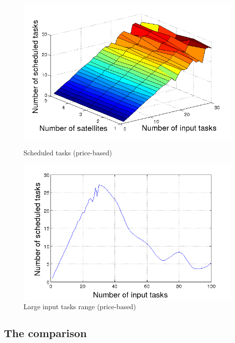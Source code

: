 \begin{figure}[ht]
  \begin{minipage}[b]{0.5\linewidth}
    \includegraphics[width=\linewidth]{Figures/aMB_sw.png}
    \caption{Scheduled tasks (price-based)}\label{fig_aMB_sw}
  \end{minipage}
    \begin{minipage}[b]{0.5\linewidth}
    \includegraphics[width=\linewidth]{Figures/aMB.png}
    \caption{Large input tasks range (price-based)}\label{fig_aMB}
  \end{minipage}
  \hfill
\end{figure}


\subsection{The comparison}

